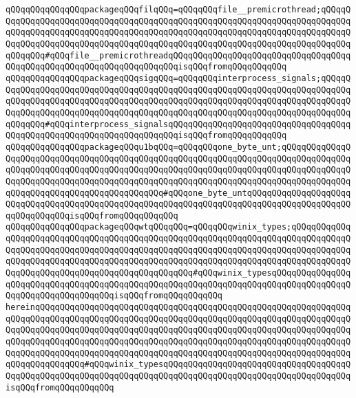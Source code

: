 \verb|qQQqqQQqqQQqqQQqpackageqQQqfilqQQq=qQQqqQQqfile__premicrothread;qQQqqQQqqQQqqQQqqQQqqQQqqQQqqQQqqQQqqQQqqQQqqQQqqQQqqQQqqQQqqQQqqQQqqQQqqQQqqQQqqQQqqQQqqQQqqQQqqQQqqQQqqQQqqQQqqQQqqQQqqQQqqQQqqQQqqQQqqQQqqQQqqQQqqQQqqQQqqQQqqQQqqQQqqQQqqQQqqQQqqQQqqQQqqQQqqQQqqQQqqQQqqQQqqQQqqQQqqQQqqQQq#qQQqfile__premicrothreadqQQqqQQqqQQqqQQqqQQqqQQqqQQqqQQqqQQqqQQqqQQqqQQqqQQqqQQqqQQqqQQqqQQqqQQqisqQQqfromqQQqqQQqqQQq|\newline
\verb|qQQqqQQqqQQqqQQqpackageqQQqsigqQQq=qQQqqQQqinterprocess_signals;qQQqqQQqqQQqqQQqqQQqqQQqqQQqqQQqqQQqqQQqqQQqqQQqqQQqqQQqqQQqqQQqqQQqqQQqqQQqqQQqqQQqqQQqqQQqqQQqqQQqqQQqqQQqqQQqqQQqqQQqqQQqqQQqqQQqqQQqqQQqqQQqqQQqqQQqqQQqqQQqqQQqqQQqqQQqqQQqqQQqqQQqqQQqqQQqqQQqqQQqqQQqqQQqqQQqqQQqqQQqqQQq#qQQqinterprocess_signalsqQQqqQQqqQQqqQQqqQQqqQQqqQQqqQQqqQQqqQQqqQQqqQQqqQQqqQQqqQQqqQQqqQQqqQQqisqQQqfromqQQqqQQqqQQq|\newline
\verb|qQQqqQQqqQQqqQQqpackageqQQqu1bqQQq=qQQqqQQqone_byte_unt;qQQqqQQqqQQqqQQqqQQqqQQqqQQqqQQqqQQqqQQqqQQqqQQqqQQqqQQqqQQqqQQqqQQqqQQqqQQqqQQqqQQqqQQqqQQqqQQqqQQqqQQqqQQqqQQqqQQqqQQqqQQqqQQqqQQqqQQqqQQqqQQqqQQqqQQqqQQqqQQqqQQqqQQqqQQqqQQqqQQqqQQqqQQqqQQqqQQqqQQqqQQqqQQqqQQqqQQqqQQqqQQqqQQqqQQqqQQqqQQqqQQqqQQqqQQqqQQq#qQQqone_byte_untqQQqqQQqqQQqqQQqqQQqqQQqqQQqqQQqqQQqqQQqqQQqqQQqqQQqqQQqqQQqqQQqqQQqqQQqqQQqqQQqqQQqqQQqqQQqqQQqqQQqqQQqisqQQqfromqQQqqQQqqQQq|\newline
\verb|qQQqqQQqqQQqqQQqpackageqQQqwtqQQqqQQq=qQQqqQQqwinix_types;qQQqqQQqqQQqqQQqqQQqqQQqqQQqqQQqqQQqqQQqqQQqqQQqqQQqqQQqqQQqqQQqqQQqqQQqqQQqqQQqqQQqqQQqqQQqqQQqqQQqqQQqqQQqqQQqqQQqqQQqqQQqqQQqqQQqqQQqqQQqqQQqqQQqqQQqqQQqqQQqqQQqqQQqqQQqqQQqqQQqqQQqqQQqqQQqqQQqqQQqqQQqqQQqqQQqqQQqqQQqqQQqqQQqqQQqqQQqqQQqqQQqqQQqqQQqqQQqqQQq#qQQqwinix_typesqQQqqQQqqQQqqQQqqQQqqQQqqQQqqQQqqQQqqQQqqQQqqQQqqQQqqQQqqQQqqQQqqQQqqQQqqQQqqQQqqQQqqQQqqQQqqQQqqQQqqQQqqQQqisqQQqfromqQQqqQQqqQQq|\newline
\verb|hereinqQQqqQQqqQQqqQQqqQQqqQQqqQQqqQQqqQQqqQQqqQQqqQQqqQQqqQQqqQQqqQQqqQQqqQQqqQQqqQQqqQQqqQQqqQQqqQQqqQQqqQQqqQQqqQQqqQQqqQQqqQQqqQQqqQQqqQQqqQQqqQQqqQQqqQQqqQQqqQQqqQQqqQQqqQQqqQQqqQQqqQQqqQQqqQQqqQQqqQQqqQQqqQQqqQQqqQQqqQQqqQQqqQQqqQQqqQQqqQQqqQQqqQQqqQQqqQQqqQQqqQQqqQQqqQQqqQQqqQQqqQQqqQQqqQQqqQQqqQQqqQQqqQQqqQQqqQQqqQQqqQQqqQQqqQQqqQQqqQQqqQQqqQQqqQQqqQQqqQQq#qQQqwinix_typesqQQqqQQqqQQqqQQqqQQqqQQqqQQqqQQqqQQqqQQqqQQqqQQqqQQqqQQqqQQqqQQqqQQqqQQqqQQqqQQqqQQqqQQqqQQqqQQqqQQqqQQqqQQqisqQQqfromqQQqqQQqqQQq|\newline
